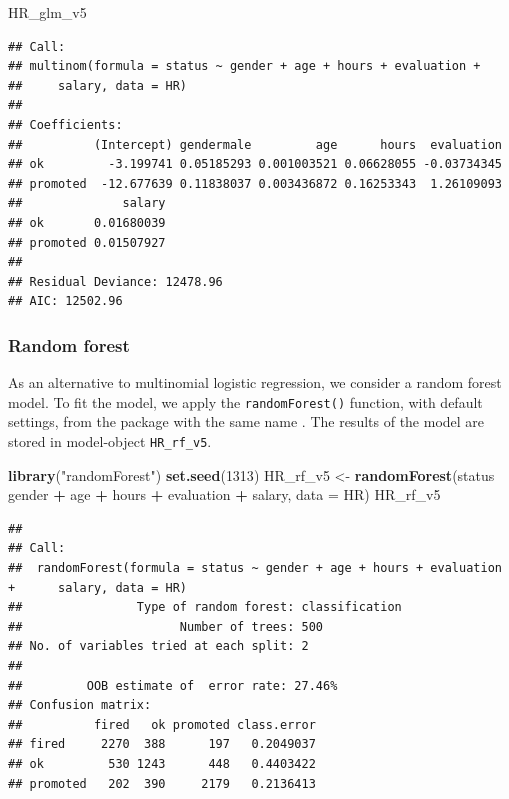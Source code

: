 \documentclass[12pt,]{krantz}
\newenvironment{Shaded}{\begin{snugshade}}{\end{snugshade}}
\newcommand{\DataTypeTok}[1]{\textcolor[rgb]{0.13,0.29,0.53}{#1}}
\newcommand{\DecValTok}[1]{\textcolor[rgb]{0.00,0.00,0.81}{#1}}
\newcommand{\KeywordTok}[1]{\textcolor[rgb]{0.13,0.29,0.53}{\textbf{#1}}}
\newcommand{\NormalTok}[1]{#1}
\newcommand{\OperatorTok}[1]{\textcolor[rgb]{0.81,0.36,0.00}{\textbf{#1}}}
\newcommand{\StringTok}[1]{\textcolor[rgb]{0.31,0.60,0.02}{#1}}
\theoremstyle{definition}
\theoremstyle{definition}
\theoremstyle{definition}
\theoremstyle{remark}
\begin{document}
\begin{Shaded}
\begin{Highlighting}[]
\NormalTok{HR_glm_v5}
\end{Highlighting}
\end{Shaded}

\begin{verbatim}
## Call:
## multinom(formula = status ~ gender + age + hours + evaluation + 
##     salary, data = HR)
## 
## Coefficients:
##          (Intercept) gendermale         age      hours  evaluation
## ok         -3.199741 0.05185293 0.001003521 0.06628055 -0.03734345
## promoted  -12.677639 0.11838037 0.003436872 0.16253343  1.26109093
##              salary
## ok       0.01680039
## promoted 0.01507927
## 
## Residual Deviance: 12478.96 
## AIC: 12502.96
\end{verbatim}

\hypertarget{model-HR-rf}{%
\subsubsection{Random forest}\label{model-HR-rf}}

As an alternative to multinomial logistic regression, we consider a
random forest model. To fit the model, we apply the
\texttt{randomForest()} function, with default settings, from the
package with the same name \citep{randomForestRNews}. The results of the
model are stored in model-object \texttt{HR\_rf\_v5}.

\begin{Shaded}
\begin{Highlighting}[]
\KeywordTok{library}\NormalTok{(}\StringTok{"randomForest"}\NormalTok{)}
\KeywordTok{set.seed}\NormalTok{(}\DecValTok{1313}\NormalTok{)}
\NormalTok{HR_rf_v5 <-}\StringTok{ }\KeywordTok{randomForest}\NormalTok{(status }\OperatorTok{~}\StringTok{ }\NormalTok{gender }\OperatorTok{+}\StringTok{ }\NormalTok{age }\OperatorTok{+}\StringTok{ }\NormalTok{hours }\OperatorTok{+}\StringTok{ }\NormalTok{evaluation }\OperatorTok{+}\StringTok{ }\NormalTok{salary, }\DataTypeTok{data =}\NormalTok{ HR)}
\NormalTok{HR_rf_v5}
\end{Highlighting}
\end{Shaded}

\begin{verbatim}
## 
## Call:
##  randomForest(formula = status ~ gender + age + hours + evaluation +      salary, data = HR) 
##                Type of random forest: classification
##                      Number of trees: 500
## No. of variables tried at each split: 2
## 
##         OOB estimate of  error rate: 27.46%
## Confusion matrix:
##          fired   ok promoted class.error
## fired     2270  388      197   0.2049037
## ok         530 1243      448   0.4403422
## promoted   202  390     2179   0.2136413
\end{verbatim}
\end{document}
